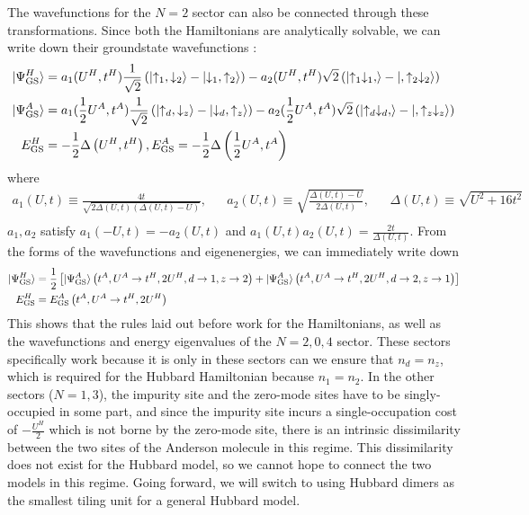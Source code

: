 \documentclass[12pt]{article}
\numberwithin{equation}{section}
\begin{document}
The wavefunctions for the \(N=2\) sector can also be connected through these transformations. Since both the Hamiltonians are analytically solvable, we can write down their groundstate wavefunctions \cite{pavarini}:
\begin{equation}\begin{aligned}
	\ket{\Psi^H_\text{GS}} &= a_1(U^H, t^H)\frac{1}{\sqrt 2}\left(\ket{\uparrow_1, \downarrow_2} - \ket{\downarrow_1, \uparrow_2}\right) - a_2(U^H,t^H){\sqrt 2}\left(\ket{\uparrow_1\downarrow_1, } - \ket{,\uparrow_2\downarrow_2}\right)\\
	\ket{\Psi^A_\text{GS}} &= a_1(\frac{1}{2}U^A, t^A)\frac{1}{\sqrt 2}\left(\ket{\uparrow_d, \downarrow_z} - \ket{\downarrow_d, \uparrow_z}\right) - a_2(\frac{1}{2}U^A,t^A){\sqrt 2}\left(\ket{\uparrow_d\downarrow_d, } - \ket{,\uparrow_z\downarrow_z}\right)\\
	E^H_\text{GS} &=  -\frac{1}{2}\Delta\left( U^H, t^H \right), E^A_\text{GS} =  -\frac{1}{2}\Delta\left( \frac{1}{2}U^A, t^A \right)
\end{aligned}\end{equation}
where 
\begin{equation}\begin{aligned}
	a_1(U,t) \equiv \frac{4t}{\sqrt{2\Delta(U,t)\left( \Delta(U,t) - U \right) }}, && a_2(U,t) \equiv \sqrt{\frac{\Delta(U,t) - U}{2\Delta(U,t)}}, &&\Delta(U,t) \equiv \sqrt{U^2 + 16t^2}\\
\end{aligned}\end{equation}
$a_1,a_2$ satisfy $a_1(-U,t) = -a_2(U,t)$ and $a_1(U,t)a_2(U,t)= \frac{2t}{\Delta(U,t)}$.
From the forms of the wavefunctions and eigenenergies, we can immediately write down
\begin{equation}\begin{aligned}
	\ket{\Psi^H_\text{GS}} &= \frac{1}{2}\left[\ket{\Psi^A_\text{GS}}\left(t^A, U^A \to t^H, 2U^H, d \to 1, z \to 2\right) + \ket{\Psi^A_\text{GS}}\left(t^A, U^A \to t^H, 2U^H, d \to 2, z \to 1\right)\right]\\
	E^H_\text{GS} &= E^A_\text{GS}\left(t^A, U^A \to t^H, 2U^H\right)
\end{aligned}\end{equation}
This shows that the rules laid out before work for the Hamiltonians, as well as the wavefunctions and energy eigenvalues of the \(N=2,0,4\) sector. These sectors specifically work because it is only in these sectors can we ensure that \(n_d = n_z\), which is required for the Hubbard Hamiltonian because \(n_1 = n_2\). In the other sectors (\(N=1,3\)), the impurity site and the zero-mode sites have to be singly-occupied in some part, and since the impurity site incurs a single-occupation cost of \(-\frac{U^H}{2}\) which is not borne by the zero-mode site, there is an intrinsic dissimilarity between the two sites of the Anderson molecule in this regime. This dissimilarity does not exist for the Hubbard model, so we cannot hope to connect the two models in this regime. Going forward, we will switch to using Hubbard dimers as the smallest tiling unit for a general Hubbard model.
\end{document}
